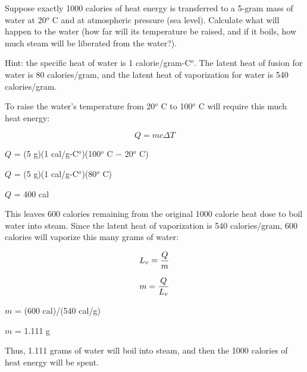

Suppose exactly 1000 calories of heat energy is transferred to a 5-gram mass of water at 20$^{o}$ C and at atmospheric pressure (sea level).  Calculate what will happen to the water (how far will its temperature be raised, and if it boils, how much steam will be liberated from the water?).

\vskip 10pt

Hint: the specific heat of water is 1 calorie/gram-C$^{o}$.  The latent heat of fusion for water is 80 calories/gram, and the latent heat of vaporization for water is 540 calories/gram.







To raise the water's temperature from 20$^{o}$ C to 100$^{o}$ C will require this much heat energy:

$$Q = m c \Delta T$$

$Q$ = (5 g)(1 cal/g-C$^{o}$)(100$^{o}$ C $-$ 20$^{o}$ C)
 
\vskip 10pt

$Q$ = (5 g)(1 cal/g-C$^{o}$)(80$^{o}$ C) 
 
\vskip 10pt

$Q$ = 400 cal 
 
\vskip 10pt

This leaves 600 calories remaining from the original 1000 calorie heat dose to boil water into steam.  Since the latent heat of vaporization is 540 calories/gram, 600 calories will vaporize this many grams of water:
 
\vskip 10pt

$$L_v = {Q \over m}$$

$$m = {Q \over L_v}$$

$m$ = (600 cal)/(540 cal/g)

\vskip 10pt

$m$ = 1.111 g
 
\vskip 10pt
 
Thus, 1.111 grams of water will boil into steam, and then the 1000 calories of heat energy will be spent.











